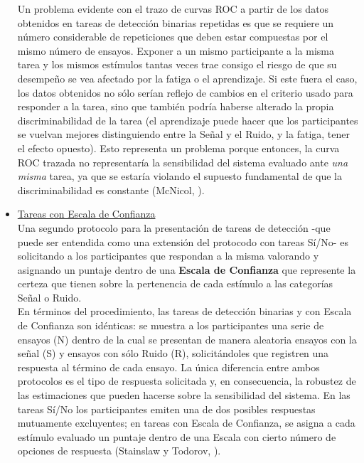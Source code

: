 \begin{itemize}
Un problema evidente con el trazo de curvas ROC a partir de los datos obtenidos en tareas de detección binarias repetidas es que se requiere un número considerable de repeticiones que deben estar compuestas por el mismo número de ensayos. Exponer a un mismo participante a la misma tarea y los mismos estímulos tantas veces trae consigo el riesgo de que su desempeño se vea afectado por la fatiga o el aprendizaje. Si este fuera el caso, los datos obtenidos no sólo serían reflejo de cambios en el criterio usado para responder a la tarea, sino que también podría haberse alterado la propia discriminabilidad de la tarea (el aprendizaje puede hacer que los participantes se vuelvan mejores distinguiendo entre la Señal y el Ruido, y la fatiga, tener el efecto opuesto). Esto representa un problema porque entonces, la curva ROC trazada no representaría la sensibilidad del sistema evaluado ante \textit{una misma} tarea, ya que se estaría violando el supuesto fundamental de que la discriminabilidad es constante (McNicol, \citeyear{McNicol2}).\\

\item \underline{Tareas con Escala de Confianza}\\

Una segundo protocolo para la presentación de tareas de detección -que puede ser entendida como una extensión del protocodo con tareas Sí/No- es solicitando a los participantes que respondan a la misma valorando y asignando un puntaje dentro de una \textbf{Escala de Confianza} que represente la certeza que tienen sobre la pertenencia de cada estímulo a las categorías Señal o Ruido.\\

En términos del procedimiento, las tareas de detección binarias y con Escala de Confianza son idénticas: se muestra a los participantes una serie de ensayos (N) dentro de la cual se presentan de manera aleatoria ensayos con la señal (S) y ensayos con sólo Ruido (R), solicitándoles que registren una respuesta al término de cada ensayo. La única diferencia entre ambos protocolos es el tipo de respuesta solicitada y, en consecuencia, la robustez de las estimaciones que pueden hacerse sobre la sensibilidad del sistema. En las tareas Sí/No los participantes emiten una de dos posibles respuestas mutuamente excluyentes; en tareas con Escala de Confianza, se asigna a cada estímulo evaluado un puntaje dentro de una Escala con cierto número de opciones de respuesta (Stainslaw y Todorov, \citeyear{Stainslaw1999}).\\


\end{itemize}
